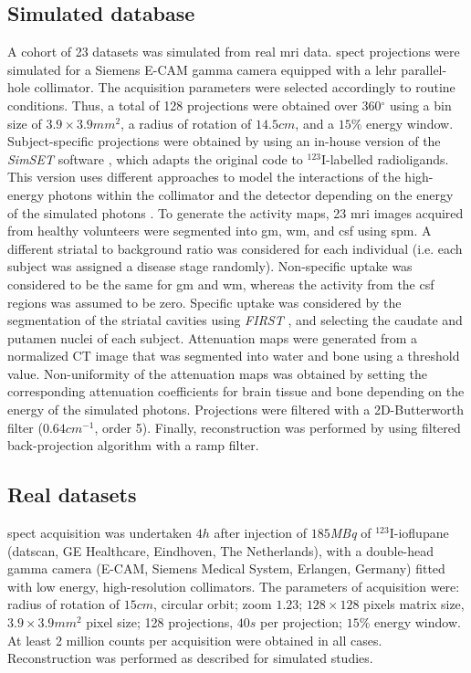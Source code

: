 \documentclass{frontiers}
\newcommand{\degree}{\ensuremath{^{\circ}}}
\begin{document}
\subsection{Simulated database} %
\label{sec:data_simulated}
A cohort of 23 datasets was simulated from real \gls*{mri} data.
  \Gls*{spect} projections were simulated  for a Siemens E-CAM gamma
  camera equipped with a \acrlong*{lehr} parallel-hole collimator.
The acquisition parameters were selected accordingly to routine conditions.
Thus, a total of 128 projections were obtained over 360{\degree} using a
  bin size of $3.9\times3.9mm^{2}$, a radius of rotation of $14.5cm$, and
  a $15\%$ energy window.
Subject-specific projections were obtained by using an in-house version
  \citep{crespo_quantification_2008} of the \emph{SimSET} software
  \citep{harrison_preliminary_1993}, which adapts the original code
  to $^{123}$I-labelled radioligands.
This version uses different approaches to model the interactions of
  the high-energy photons within the collimator and the detector depending
  on the energy of the simulated photons 
  \citep{cot_study_2004, cot_modeling_2006}.
To generate the activity maps, 23 \gls*{mri} images acquired from healthy
  volunteers were segmented into \gls*{gm}, \gls*{wm}, and \gls*{csf}
  using \gls*{spm}.
A different striatal to background ratio was considered for each individual
  (i.e. each subject was assigned a disease stage randomly).
Non-specific uptake was considered to be the same for \gls*{gm} and \gls*{wm},
  whereas the activity from the \gls*{csf} regions was assumed to be zero.
Specific uptake was considered by the segmentation of the striatal cavities
  using \emph{FIRST} \citep{patenaude_bayesian_2011},
  and selecting the caudate and putamen nuclei of each subject.
Attenuation maps were generated from a normalized CT image that was
  segmented into water and bone using a threshold value.
Non-uniformity of the attenuation maps was obtained by setting the
  corresponding attenuation coefficients for brain tissue and bone
  depending on the energy of the simulated photons.
Projections were filtered with a 2D-Butterworth filter ($0.64cm^{-1}$,
  order 5). Finally, reconstruction was performed by using filtered 
  back-projection algorithm with a ramp filter.

\subsection{Real datasets} %
\label{sec:data_real}
\Gls*{spect} acquisition was undertaken $4h$
  after injection  of $185$\textit{MBq} of $^{123}$I-ioflupane
  (\Gls*{datscan}, GE Healthcare, Eindhoven, The Netherlands),
  with a  double-head gamma camera (E-CAM, Siemens Medical System,
  Erlangen, Germany) fitted with low energy, high-resolution collimators.
The parameters of acquisition were: radius of rotation of $15cm$,
  circular orbit; zoom $1.23$; $128\times128$
  pixels matrix size, $3.9\times3.9mm^{2}$ pixel size;
  128 projections, $40s$ per projection; 
  $15\%$ energy window.
At least 2 million counts per acquisition were obtained in all cases.
Reconstruction was performed as described for simulated studies.
\end{document}
